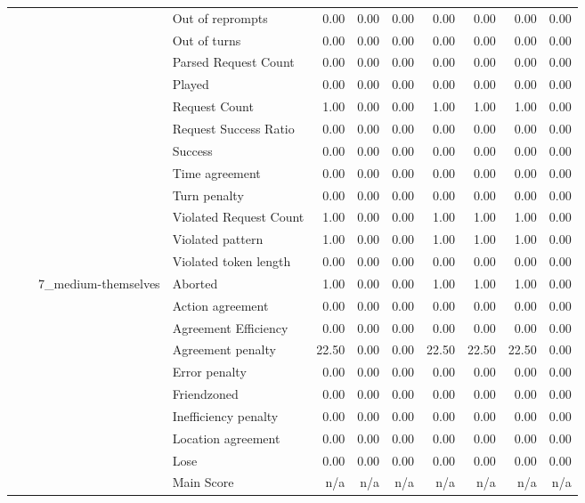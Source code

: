 \begin{tabular}{llllrrrrrrr}
 &  &  & Out of reprompts & 0.00 & 0.00 & 0.00 & 0.00 & 0.00 & 0.00 & 0.00 \\
 &  &  & Out of turns & 0.00 & 0.00 & 0.00 & 0.00 & 0.00 & 0.00 & 0.00 \\
 &  &  & Parsed Request Count & 0.00 & 0.00 & 0.00 & 0.00 & 0.00 & 0.00 & 0.00 \\
 &  &  & Played & 0.00 & 0.00 & 0.00 & 0.00 & 0.00 & 0.00 & 0.00 \\
 &  &  & Request Count & 1.00 & 0.00 & 0.00 & 1.00 & 1.00 & 1.00 & 0.00 \\
 &  &  & Request Success Ratio & 0.00 & 0.00 & 0.00 & 0.00 & 0.00 & 0.00 & 0.00 \\
 &  &  & Success & 0.00 & 0.00 & 0.00 & 0.00 & 0.00 & 0.00 & 0.00 \\
 &  &  & Time agreement & 0.00 & 0.00 & 0.00 & 0.00 & 0.00 & 0.00 & 0.00 \\
 &  &  & Turn penalty & 0.00 & 0.00 & 0.00 & 0.00 & 0.00 & 0.00 & 0.00 \\
 &  &  & Violated Request Count & 1.00 & 0.00 & 0.00 & 1.00 & 1.00 & 1.00 & 0.00 \\
 &  &  & Violated pattern & 1.00 & 0.00 & 0.00 & 1.00 & 1.00 & 1.00 & 0.00 \\
 &  &  & Violated token length & 0.00 & 0.00 & 0.00 & 0.00 & 0.00 & 0.00 & 0.00 \\
\cline{3-11}
 &  & \multirow[t]{27}{*}{7_medium-themselves} & Aborted & 1.00 & 0.00 & 0.00 & 1.00 & 1.00 & 1.00 & 0.00 \\
 &  &  & Action agreement & 0.00 & 0.00 & 0.00 & 0.00 & 0.00 & 0.00 & 0.00 \\
 &  &  & Agreement Efficiency & 0.00 & 0.00 & 0.00 & 0.00 & 0.00 & 0.00 & 0.00 \\
 &  &  & Agreement penalty & 22.50 & 0.00 & 0.00 & 22.50 & 22.50 & 22.50 & 0.00 \\
 &  &  & Error penalty & 0.00 & 0.00 & 0.00 & 0.00 & 0.00 & 0.00 & 0.00 \\
 &  &  & Friendzoned & 0.00 & 0.00 & 0.00 & 0.00 & 0.00 & 0.00 & 0.00 \\
 &  &  & Inefficiency penalty & 0.00 & 0.00 & 0.00 & 0.00 & 0.00 & 0.00 & 0.00 \\
 &  &  & Location agreement & 0.00 & 0.00 & 0.00 & 0.00 & 0.00 & 0.00 & 0.00 \\
 &  &  & Lose & 0.00 & 0.00 & 0.00 & 0.00 & 0.00 & 0.00 & 0.00 \\
 &  &  & Main Score & n/a & n/a & n/a & n/a & n/a & n/a & n/a \\

\end{tabular}
